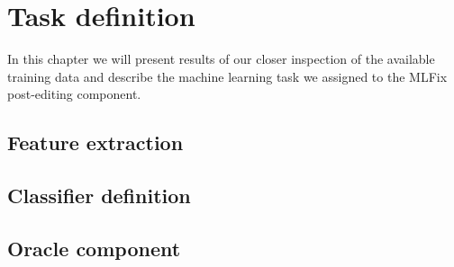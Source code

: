 \chapter{Task definition}

In this chapter we will present results of our closer inspection
of the available training data and describe the machine learning
task we assigned to the MLFix post-editing component.

\section{Feature extraction}

\section{Classifier definition}

\section{Oracle component}
